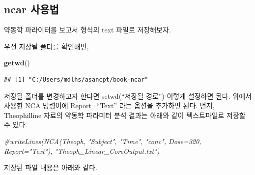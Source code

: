 \documentclass[]{krantz}
\makeatletter
\newenvironment{Shaded}{\begin{snugshade}}{\end{snugshade}}
\newcommand{\KeywordTok}[1]{\textcolor[rgb]{0.13,0.29,0.53}{\textbf{#1}}}
\newcommand{\CommentTok}[1]{\textcolor[rgb]{0.56,0.35,0.01}{\textit{#1}}}
\newcommand{\NormalTok}[1]{#1}
\newenvironment{kframe}{%
\medskip{}
\setlength{\fboxsep}{.8em}
 \def\at@end@of@kframe{}%
 \ifinner\ifhmode%
  \def\at@end@of@kframe{\end{minipage}}%
  \begin{minipage}{\columnwidth}%
 \fi\fi%
 \def\FrameCommand##1{\hskip\@totalleftmargin \hskip-\fboxsep
 \colorbox{shadecolor}{##1}\hskip-\fboxsep
     \hskip-\linewidth \hskip-\@totalleftmargin \hskip\columnwidth}%
 \MakeFramed {\advance\hsize-\width
   \@totalleftmargin\z@ \linewidth\hsize
   \@setminipage}}%
 {\par\unskip\endMakeFramed%
 \at@end@of@kframe}
\renewenvironment{Shaded}{\begin{kframe}}{\end{kframe}}
\theoremstyle{definition}
\theoremstyle{definition}
\theoremstyle{definition}
\theoremstyle{remark}
\makeatother
\begin{document}
\subsection{ncar 사용법}\label{ncar-}

약동학 파라이터를 보고서 형식의 text 파일로 저장해보자.

우선 저장될 폴더를 확인해면,

\begin{Shaded}
\begin{Highlighting}[]
\KeywordTok{getwd}\NormalTok{()}
\end{Highlighting}
\end{Shaded}

\begin{verbatim}
## [1] "C:/Users/mdlhs/asancpt/book-ncar"
\end{verbatim}

저장될 폴더를 변경하고자 한다면 setwd(``저장될 경로'') 이렇게 설정하면
된다. 위에서 사용한 NCA 명령어에 Report=``Text'' 라는 옵션을 추가하면
된다. 먼저, Theophilline 자료의 약동학 파라미터 분석 결과는 아래와 같이
텍스트파일로 저장할 수 있다.

\begin{Shaded}
\begin{Highlighting}[]
\CommentTok{#writeLines(NCA(Theoph, "Subject", "Time", "conc", Dose=320, Report="Text"), "Theoph_Linear_CoreOutput.txt")}
\end{Highlighting}
\end{Shaded}

저장된 파일 내용은 아래와 같다.
\end{document}
